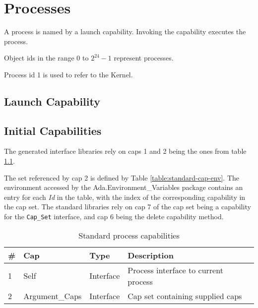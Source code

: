\chapter{Processes}

A process is named by a launch capability.  Invoking the capability executes the process.

Object ids in the range $0$ to $2^{24} - 1$ represent processes.

Process id 1 is used to refer to the Kernel.

\section{Launch Capability}

\section{Initial Capabilities}

The generated interface libraries rely on caps 1 and 2 being the ones from table \ref{table:standard-caps}.

The set referenced by cap 2 is defined by Table \ref{table:standard-cap-env}.
The environment accessed by the Ada.Environment\_Variables package contains an entry for each {\em Id} in the table, with the index of the corresponding capability in the cap set.
The standard libraries rely on cap 7 of the cap set being a capability for the {\tt Cap\_Set} interface, and cap 6 being the delete capability method.

\begin{table}[ht]
\begin{tabular}{l l l l l}
\hline\hline
\# & Cap & Type & Description \\
\hline
1 & Self & Interface & Process interface to current process \\
2 & Argument\_Caps & Interface & Cap set containing supplied caps \\
\hline
\end{tabular}
\caption{Standard process capabilities}
\label{table:standard-caps}
\end{table}

